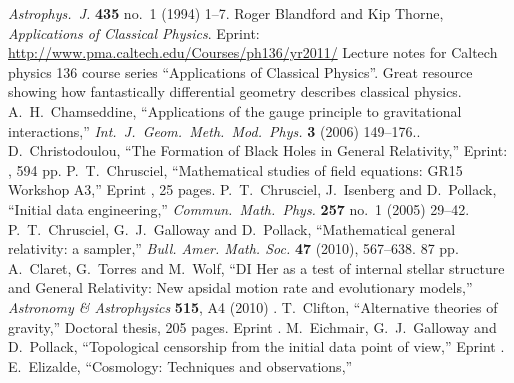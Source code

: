 \begin{thebibliography}{99}
  \emph{Astrophys.\ J.} {\bf 435} no.~1 (1994) 1--7.
  Roger Blandford and Kip Thorne,\newblock
  \emph{Applications of Classical Physics}.\newblock
  Eprint: \url{http://www.pma.caltech.edu/Courses/ph136/yr2011/}\newblock
  Lecture notes for Caltech physics 136 course series
  ``Applications of Classical Physics''.\newblock
  Great resource showing how fantastically differential geometry
  describes classical physics.
  A.~H.~Chamseddine,\newblock
  ``Applications of the gauge principle to gravitational interactions,''\newblock
  \emph{Int.\ J.\ Geom.\ Meth.\ Mod.\ Phys.} {\bf 3} (2006) 149--176..
  D.~Christodoulou,\newblock
  ``The Formation of Black Holes in General Relativity,''\newblock
  Eprint: , 594 pp.
  P.~T.~Chrusciel,\newblock
  ``Mathematical studies of field equations: GR15 Workshop A3,''\newblock
  Eprint , 25 pages.
  P.~T.~Chrusciel, J.~Isenberg and D.~Pollack,\newblock
  ``Initial data engineering,''\newblock
  \emph{Commun.\ Math.\ Phys.} {\bf 257} no.~1 (2005) 29--42\newblock
  [\arXiv{gr-qc/0403066}].
  P.~T.~Chrusciel, G.~J.~Galloway and D.~Pollack,\newblock
  ``Mathematical general relativity: a sampler,''\newblock
  \emph{Bull. Amer. Math. Soc.} {\bf 47} (2010), 567--638.\newblock
   87 pp.
  A.~Claret, G.~Torres and M.~Wolf,\newblock
  ``DI Her as a test of internal stellar structure and General Relativity: New apsidal motion rate and evolutionary models,''\newblock
  \emph{Astronomy \& Astrophysics} \textbf{515}, A4 (2010)\newblock
  .
  T.~Clifton,\newblock
  ``Alternative theories of gravity,''\newblock
  Doctoral thesis, 205 pages. Eprint .
  M.~Eichmair, G.~J.~Galloway and D.~Pollack,\newblock
  ``Topological censorship from the initial data point of view,''\newblock
  Eprint .
  E.~Elizalde,\newblock
  ``Cosmology: Techniques and observations,''\newblock

\end{thebibliography}
